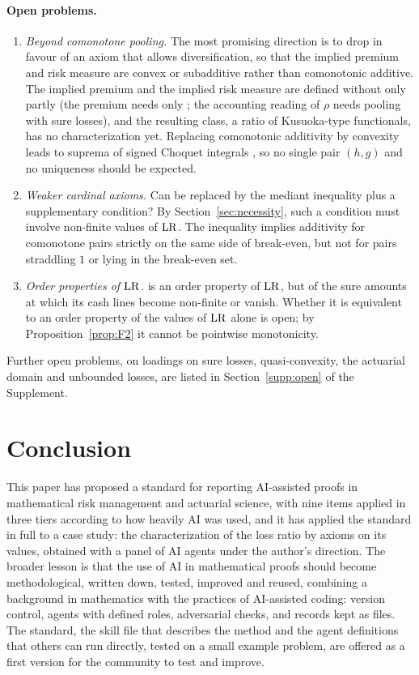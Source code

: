\paragraph{Open problems.}
\begin{enumerate}[label=(\arabic*)]
\item \emph{Beyond comonotone pooling.} The most promising direction is to drop \axR{} in favour of an axiom
  that allows diversification, so that the implied premium and risk measure are convex or subadditive rather
  than comonotonic additive. The implied premium and the implied risk measure are defined without \axR{} only
  partly (the premium needs only \axP; the accounting reading of $\rho$ needs pooling with sure losses), and the
  resulting class, a ratio of Kusuoka-type functionals, has no characterization yet. Replacing comonotonic
  additivity by convexity leads to suprema of signed Choquet integrals \citep{liu2020}, so no single pair $(h,g)$
  and no uniqueness should be expected.
\item \emph{Weaker cardinal axioms.} Can \axR{} be replaced by the mediant inequality plus a supplementary
  condition? By Section~\ref{sec:necessity}, such a condition must involve non-finite values of $\mathrm{LR}$. The inequality implies additivity for comonotone pairs strictly on the same side of break-even, but
  not for pairs straddling $1$ or lying in the break-even set.
\item \emph{Order properties of $\mathrm{LR}$.} \axRM{} is an order property of $\mathrm{LR}$, but of the sure amounts at which
  its cash lines become non-finite or vanish. Whether it is equivalent to an order property of the values of $\mathrm{LR}$ alone is open; by
  Proposition~\ref{prop:F2} it cannot be pointwise monotonicity.
\end{enumerate}
Further open problems, on loadings on sure losses, quasi-convexity, the actuarial domain and unbounded losses, are
listed in Section~\ref{supp:open} of the Supplement.

\section{Conclusion}\label{sec:conclusion}

This paper has proposed a standard for reporting AI-assisted proofs in mathematical risk management and actuarial
science, with nine items applied in three tiers according to how heavily AI was used, and it has applied the
standard in full to a case study: the characterization of the loss ratio by axioms on its values, obtained with a
panel of AI agents under the author's direction. The broader lesson is that the use of AI in mathematical proofs
should become methodological, written down, tested, improved and reused, combining a background in mathematics with
the practices of AI-assisted coding: version control, agents with defined roles, adversarial checks, and records kept
as files. The standard, the skill file that describes the
method and the agent definitions that others can run directly, tested on a small example problem, are offered as a
first version for the community to test and improve.

